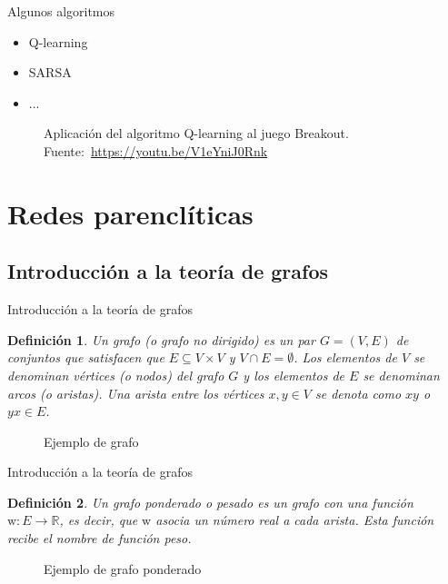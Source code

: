 \documentclass[hyperref={unicode}]{beamer}
\newtheorem{defi}{\textbf{\color{ExecusharesBlue}Definición}}
\begin{document}
\begin{frame}{Algunos algoritmos}
	\begin{minipage}{0.3\textwidth}
		\begin{itemize}
			\item Q-learning
			\item SARSA
			\item ...
		\end{itemize}
	\end{minipage}
	\hfill
	\begin{minipage}{0.65\textwidth}
		\begin{figure}[htbp!]
			\centering
			\caption{Aplicación del algoritmo Q-learning al juego Breakout. Fuente:~\url{https://youtu.be/V1eYniJ0Rnk}}
		\end{figure}
	\end{minipage}
\end{frame}

\section{Redes parenclíticas}
\subsection{Introducción a la teoría de grafos}
\begin{frame}{Introducción a la teoría de grafos}
	\begin{defi}
		Un grafo (o grafo no dirigido) es un par $G = (V,E)$ de conjuntos que satisfacen que $E \subseteq V\times V$ y $V \cap E = \emptyset$. Los elementos de $V$ se denominan vértices (o nodos) del grafo $G$ y los elementos de $E$ se denominan arcos (o aristas). Una arista entre los vértices $x, y \in V$ se denota como $xy$ o $yx \in E$.
	\end{defi}
	
	\begin{figure}[htb]
		\centering
		\resizebox{0.25\textheight}{!}{\ejemplografo}
		\caption{Ejemplo de grafo}
		\label{fig:grafo}
	\end{figure}
\end{frame}

\begin{frame}{Introducción a la teoría de grafos}
	\begin{defi}

			Un grafo ponderado o pesado es un grafo con una función $\mathrm{w} : E \to \mathbb{R}$, es decir, que $\mathrm{w}$ asocia un número real a cada arista. Esta función recibe el nombre de función peso.

	\end{defi}
	
	\begin{figure}[htb]
		\centering
		\resizebox{0.7\textheight}{!}{\ejemplografoponderado}
		\caption{Ejemplo de grafo ponderado}
		\label{fig:grafo_ponderado}
	\end{figure}
\end{frame}
\end{document}
